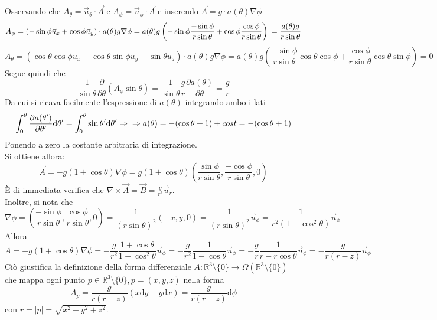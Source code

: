 Osservando che $A_\theta = \vec u _\theta \cdot \vec A $ e
$A_\phi = \vec u _\phi \cdot \vec A$ e inserendo $ \vec A = g \cdot a(\theta) \nabla \phi $
$$
         A_\phi = (-\sin\phi \vec u _x + \cos\phi \vec u _y)
                       \cdot a(\theta) g \nabla \phi
                = a(\theta)g\left( -\sin\phi \frac{-\sin\phi}{r\sin\theta}
                      + \cos\phi \frac{\cos\phi}{r\sin\theta}\right)\\
                = \frac{a(\theta)g}{r\sin\theta}
$$
$$         A_\theta = (\cos\theta \cos\phi u_x + \cos\theta \sin\phi u_y
                          - \sin\theta u_z) \cdot a(\theta) g \nabla \phi
                    = a(\theta) g \left( \frac{-\sin\phi}{r\sin\theta} \cos\theta \cos\phi
                          + \frac{\cos\phi}{r\sin\theta} \cos\theta \sin\phi \right)
                    = 0
$$
Segue quindi che
$$
   \frac{1}{\sin\theta} \frac{\partial}{\partial\theta}(A_\phi \sin\theta)
      = \frac{1}{\sin\theta} \frac{g}{r} \frac{\partial a(\theta)}{\partial \theta}
      = \frac{g}{r}
$$
Da cui si ricava facilmente l'espressione di $a(\theta)$ integrando ambo i lati
$$
   \int_0 ^\theta \frac{\partial a(\theta')}{\partial \theta'} \mathrm{d}\theta'
      = \int_0^\theta \sin\theta' \mathrm{d}\theta' \Rightarrow\\
   \Rightarrow a(\theta) = -(\cos\theta+1) + cost  = -(\cos\theta+1)
$$
Ponendo a zero la costante arbitraria di integrazione.\\
%
Si ottiene allora:
$$
   \boxed{
          \vec A = -g(1 + \cos\theta) \nabla \phi
                 = g(1 + \cos\theta)\left( \frac{\sin\phi}{r\sin\theta},
                    \frac{-\cos\phi}{r\sin\theta},0 \right)
   }
$$
È di immediata verifica che $\nabla \times \vec A = \vec B = \frac{g}{r^2} \vec u _r$.\\
%
Inoltre, si nota che
$$
   \nabla \phi = \left( \frac{-\sin\phi}{r\sin\theta},\frac{\cos\phi}{r\sin\theta},0 \right)
      = \frac{1}{(r\sin\theta)^2}(-x,y,0) = \frac{1}{(r\sin\theta)^2}\vec u _\phi
      = \frac{1}{r^2(1-\cos^2\theta)} \vec u _\phi
$$
Allora
$$
   A = -g(1+\cos\theta)\nabla\phi = -\frac{g}{r^2} \frac{1+\cos\theta}{1-\cos^2\theta} \vec u _\phi
     = -\frac{g}{r^2} \frac{1}{1-\cos\theta} \vec u _\phi
     = -\frac{g}{r} \frac{1}{r-r\cos\theta} \vec u _\phi
     = -\frac{g}{r(r-z)} \vec u _\phi
$$
Ciò giustifica la definizione della forma differenziale $ A : \mathbb{R}^3 \setminus \{0\}
\to \Omega(\mathbb{R}^3 \setminus \{0\})$ che mappa ogni punto $p \in \mathbb{R}^3 \setminus \{0\} , p = (x,y,z)$ nella forma
$$
    A_p = \frac{g}{r(r-z)}(x\mathrm{d}y-y\mathrm{d}x) = \frac{g}{r(r-z)}\mathrm{d}\phi
$$
con $r = |p| = \sqrt{x^2+y^2+z^2}$.

